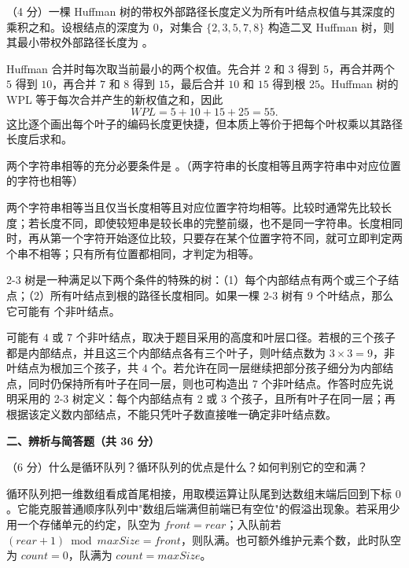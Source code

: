 \begin{question}
（4 分）一棵 Huffman 树的带权外部路径长度定义为所有叶结点权值与其深度的乘积之和。设根结点的深度为 0，对集合 $\{ 2, 3, 5, 7, 8 \}$ 构造二叉 Huffman 树，则其最小带权外部路径长度为 \blank。
\begin{solution}
Huffman 合并时每次取当前最小的两个权值。先合并 $2$ 和 $3$ 得到 $5$，再合并两个 $5$ 得到 $10$，再合并 $7$ 和 $8$ 得到 $15$，最后合并 $10$ 和 $15$ 得到根 $25$。Huffman 树的 WPL 等于每次合并产生的新权值之和，因此
\[
WPL=5+10+15+25=55.
\]
这比逐个画出每个叶子的编码长度更快捷，但本质上等价于把每个叶权乘以其路径长度后求和。
\end{solution}
\end{question}

\begin{question}
两个字符串相等的充分必要条件是 \blank。（两字符串的长度相等且两字符串中对应位置的字符也相等）
\begin{solution}
两个字符串相等当且仅当长度相等且对应位置字符均相等。比较时通常先比较长度；若长度不同，即使较短串是较长串的完整前缀，也不是同一字符串。长度相同时，再从第一个字符开始逐位比较，只要存在某个位置字符不同，就可立即判定两个串不相等；只有所有位置都相同，才判定为相等。
\end{solution}
\end{question}

\begin{question}
2-3 树是一种满足以下两个条件的特殊的树：（1）每个内部结点有两个或三个子结点；（2）所有叶结点到根的路径长度相同。如果一棵 2-3 树有 9 个叶结点，那么它可能有 \blank 个非叶结点。
\begin{solution}
可能有 $4$ 或 $7$ 个非叶结点，取决于题目采用的高度和叶层口径。若根的三个孩子都是内部结点，并且这三个内部结点各有三个叶子，则叶结点数为 $3\times3=9$，非叶结点为根加三个孩子，共 $4$ 个。若允许在同一层继续把部分孩子细分为内部结点，同时仍保持所有叶子在同一层，则也可构造出 $7$ 个非叶结点。作答时应先说明采用的 2-3 树定义：每个内部结点有 2 或 3 个孩子，且所有叶子在同一层；再根据该定义数内部结点，不能只凭叶子数直接唯一确定非叶结点数。
\end{solution}
\end{question}

\textbf{二、辨析与简答题（共 36 分）}

\begin{question}
（6 分）什么是循环队列？循环队列的优点是什么？如何判别它的空和满？
\begin{solution}
循环队列把一维数组看成首尾相接，用取模运算让队尾到达数组末端后回到下标 $0$。它能克服普通顺序队列中"数组后端满但前端已有空位"的假溢出现象。若采用少用一个存储单元的约定，队空为 $front=rear$；入队前若 $(rear+1)\bmod maxSize=front$，则队满。也可额外维护元素个数，此时队空为 $count=0$，队满为 $count=maxSize$。
\end{solution}
\end{question}

